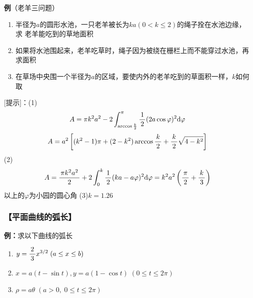 \begin{center}
\end{center}

{\bf 例}（老羊三问题）
\begin{enumerate}[(1)]
  \setlength{\itemindent}{1cm}
  \item 半径为$a$的圆形水池，一只老羊被长为$ka(0<k\leq2)$的绳子拴在水池边缘，求
  老羊能吃到的草地面积
  \item 如果将水池围起来，老羊吃草时，绳子因为被绕在栅栏上而不能穿过水池，再求面积
  \item 在草场中央围一个半径为$a$的区域，要使内外的老羊吃到的草面积一样，$k$如何取
\end{enumerate}

[提示]：(1)
$$A=\pi k^2a^2-2\displaystyle\int_{\arccos\frac k2}^{\pi}\displaystyle\frac{\,{1}\,}{\,{2}\,}(2a\cos\varphi)^2
\mathrm{d}\varphi$$
$$A=a^2\left[(k^2-1)\pi+(2-k^2)\arccos\displaystyle\frac{\,{k}\,}{\,{2}\,}+\displaystyle\frac{\,{k}\,}{\,{2}\,}
\sqrt{4-k^2}\right]$$
(2)
$$A=\displaystyle\frac{\,{\pi k^2a^2}\,}{\,{2}\,}+2\displaystyle\int_0^k\displaystyle\frac{\,{1}\,}{\,{2}\,}(ka-a\varphi)^2\mathrm{d}\varphi=k^2a^2
\left(\displaystyle\frac{\,{\pi}\,}{\,{2}\,}+\displaystyle\frac{\,{k}\,}{\,{3}\,}\right)$$
以上的$\varphi$为小园的圆心角
(3)$k=1.26$

\subsubsection{【平面曲线的弧长】}

{\bf 例：}求以下曲线的弧长 
\begin{enumerate}[(1)]
  \setlength{\itemindent}{1cm}
  \item $y=\displaystyle\frac{\,{2}\,}{\,{3}\,}x^{3/2}\;(a\leq x\leq b)$ 
  \item $x=a(t-\sin t),y=a(1-\cos t)\;(0\leq t\leq 2\pi)$ 
  \item $\rho=a\theta\;(a>0,\;0\leq t\leq 2\pi)$
\end{enumerate}

